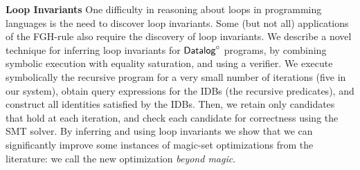 

{\bf Loop Invariants} One difficulty in reasoning about loops in
programming languages is the need to discover loop invariants.  Some
(but not all) applications of the FGH-rule also require the discovery
of loop invariants.  We describe a novel technique for inferring loop
invariants for $\text{\sf Datalog}^\circ$ programs, by combining symbolic execution with
equality saturation, and using a verifier.  We execute symbolically
the recursive program for a very small number of iterations (five in
our system), obtain query expressions for the IDBs (the recursive
predicates), and construct all identities satisfied by the IDBs.
Then, we retain only candidates that hold at each iteration, and check
each candidate for correctness using the SMT solver.  By inferring and
using loop invariants we show that we can significantly improve some
instances of magic-set optimizations from the literature: we call the
new optimization {\em beyond magic}.






